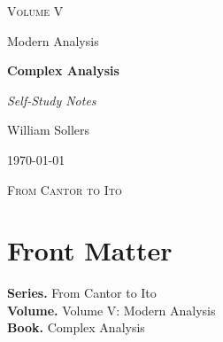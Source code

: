 \documentclass[12pt, a4paper]{report}
\begin{document}
\ExplSyntaxOff
\renewcommand{\familydefault}{\rmdefault}

\begin{titlepage}
\centering
\vspace*{3.5cm}

{\Large\scshape Volume V\par}
\vspace{0.35cm}
{\large Modern Analysis\par}

\vspace{1.4cm}

{\Huge\bfseries Complex Analysis\par}

\vspace{0.6cm}
{\large\itshape Self-Study Notes\par}

\vfill

{\large William Sollers\par}
\vspace{0.35cm}
{\large \today\par}

\vfill

{\large\scshape From Cantor to Ito\par}
\end{titlepage}

\clearpage
\thispagestyle{plain}
\chapter*{Front Matter}
\noindent\textbf{Series.} From Cantor to Ito\\[0.5em]
\textbf{Volume.} Volume V: Modern Analysis\\[0.5em]
\textbf{Book.} Complex Analysis

\clearpage
\tableofcontents
\clearpage
{}



\clearpage



\printindex[tech]
\printindex[dep]
\end{document}
